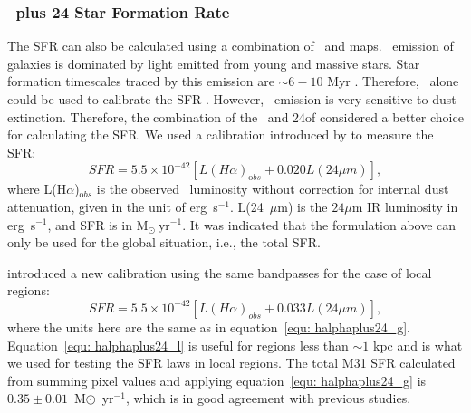 \subsubsection{\halpha\ plus 24 \um Star Formation Rate}
\label{sec:sfr_halpha}

The SFR can also be calculated using a combination of \halpha\ and  \um maps. \halpha\ emission of galaxies is dominated by light emitted from young and massive stars. Star formation timescales traced by this emission are $\sim 6-10$ Myr \citep[e.g.][]{Kennicutt09, Calzetti13}. Therefore, \halpha\ alone could be used to calibrate the SFR \citep[e.g.][]{Osterbrock06, Kennicutt09}. However, \halpha\ emission is very sensitive to dust extinction. Therefore, the combination of the \halpha\ and 24\um of considered a better choice for calculating the SFR. We used a calibration introduced by \citet{Kennicutt09} to measure the SFR:
\begin{equation}
\label{equ: halphaplus24_g}
SFR = 5.5 \times 10^{-42}[L(H{\alpha})_{\mathrm obs} + 0.020L(24\mu m)],
\end{equation}
\noindent where L(H${\alpha}$)$_{\mathrm obs}$ is the observed \halpha\ luminosity without correction for internal dust attenuation, given in the unit of erg~s$^{-1}$. L(24~$\mu$m) is the $24\mu$m IR luminosity in erg~s$^{-1}$, and SFR is in M$_{\odot}~$yr$^{-1}$. It was indicated that the formulation above can only be used for the global situation, i.e., the total SFR.

\citet{Calzetti07} introduced a new calibration using the same bandpasses for the case of local regions:
\begin{equation}
\label{equ: halphaplus24_l}
SFR = 5.5 \times 10^{-42}[L(H{\alpha})_{obs} + 0.033L(24\mu m)],
\end{equation}
\noindent where the units here are the same as in equation~\ref{equ: halphaplus24_g}. Equation~\ref{equ: halphaplus24_l} is useful for regions less than $\sim 1$ kpc and is what we used for testing the SFR laws in local regions. The total M31 SFR calculated from summing pixel values and applying equation~\ref{equ: halphaplus24_g} is $0.35 \pm 0.01$~M$\odot$~yr$^{-1}$, which is in good agreement with previous studies.

